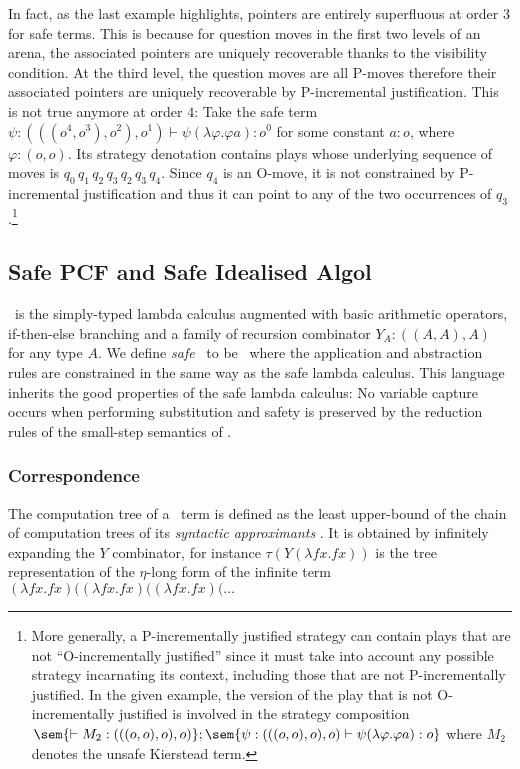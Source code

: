 In fact, as the last example highlights, pointers are entirely
superfluous at order $3$ for safe terms. This is because for
question moves in the first two levels of an arena, the associated
pointers are uniquely recoverable thanks to the visibility
condition. At the third level, the question moves are all P-moves
therefore their associated pointers are uniquely recoverable by
P-incremental justification. This is not true anymore at order $4$:
Take the safe term $\psi:(((o^4,o^3),o^2),o^1) \vdash \psi (\lambda
\varphi . \varphi a) : o^0$ for some constant $a:o$, where
$\varphi:(o,o)$. Its strategy denotation contains plays whose
underlying sequence of moves is $q_0 \, q_1 \, q_2 \, q_3 \, q_2 \,
q_3 \, q_4$. Since $q_4$ is an O-move, it is not constrained by
P-incremental justification and thus it can point to any of the two
occurrences of $q_3$.\footnote{More generally, a P-incrementally
justified strategy can contain plays that are not ``O-incrementally
justified'' since it must take into account any possible strategy
incarnating its context, including those that are not
P-incrementally justified. In the given example, the version of the
play that is not O-incrementally justified is involved in the
strategy composition $\sem{ \vdash M_2 : (((o,o),o),o)} ; \sem{
\psi:(((o,o),o),o) \vdash \psi (\lambda \varphi . \varphi a):o}$
where $M_2$ denotes the unsafe Kierstead term.}

\subsection*{Safe PCF and Safe Idealised Algol}

\pcf\ is the simply-typed lambda calculus augmented with basic
arithmetic operators, if-then-else branching and a family of
recursion combinator $Y_A : ((A,A),A)$ for any type $A$.  We define
\emph{safe} \pcf\ to be \pcf\ where the application and abstraction
rules are constrained in the same way as the safe lambda calculus.
This language inherits the good properties of the safe lambda
calculus: No variable capture occurs when performing substitution
and safety is preserved by the reduction rules of the small-step
semantics of \pcf.

\subsubsection{Correspondence}

The computation tree of a \pcf\ term is defined as the least
upper-bound of the chain of computation trees of its \emph{syntactic
approximants} \cite{abramsky:game-semantics-tutorial}.  It is
obtained by infinitely expanding the $Y$ combinator, for instance
$\tau(Y (\lambda f x. f x))$ is the tree representation of the
$\eta$-long form of the infinite term $(\lambda f x. f x)
 ((\lambda f x. f x) ((\lambda f x. f x) ( \ldots$


